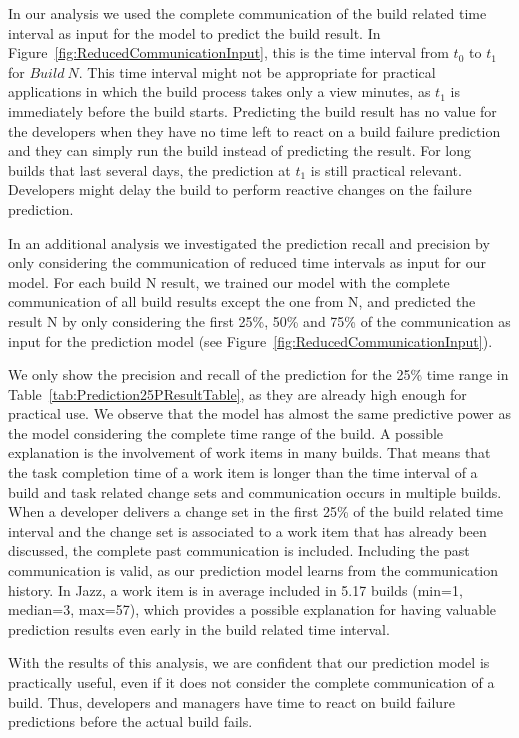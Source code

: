 \documentclass[12pt,oneside]{book}
\begin{document}
In our analysis we used the complete communication of the build related time
interval as input for the model to predict the build result. In
Figure~\ref{fig:ReducedCommunicationInput}, this is the time interval from $t_0$
to $t_1$ for $Build~N$. This time interval might not be appropriate for practical
applications in which the build process takes only a view minutes, as $t_1$ is
immediately before the build starts. Predicting the build result has no value for
the developers when they have no time left to react on a build failure prediction
and they can simply run the build instead of predicting the result. For long
builds that last several days, the prediction at $t_1$ is still practical
relevant. Developers might delay the build to perform reactive changes on the
failure prediction.

In an additional analysis we investigated the prediction recall and precision by
only considering the communication of reduced time intervals as input for our
model. For each build N result, we trained our model with the complete
communication of all build results except the one from N, and predicted the
result N by only considering the first 25\%, 50\% and 75\% of the communication
as input for the prediction model (see
Figure~\ref{fig:ReducedCommunicationInput}).

We only show the precision and recall of the prediction for the 25\% time range
in Table~\ref{tab:Prediction25PResultTable}, as they are already high enough for
practical use. We observe that the model has almost the same predictive power as
the model considering the complete time range of the build. A possible
explanation is the involvement of work items in many builds. That means that the
task completion time of a work item is longer than the time interval of a build
and task related change sets and communication occurs in multiple builds. When a
developer delivers a change set in the first 25\% of the build related time
interval and the change set is associated to a work item that has already been
discussed, the complete past communication is included. Including the past
communication is valid, as our prediction model learns from the communication
history. In Jazz, a work item is in average included in 5.17 builds (min=1,
median=3, max=57), which provides a possible explanation for having valuable
prediction results even early in the build related time interval.

With the results of this analysis, we are confident that our prediction model is
practically useful, even if it does not consider the complete communication of a
build. Thus, developers and managers have time to react on build failure
predictions before the actual build fails.
\end{document}
